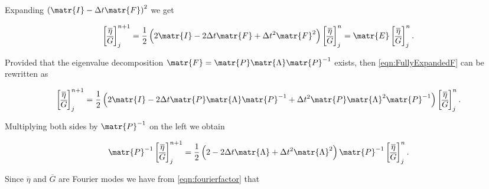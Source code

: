 Expanding $\left(\matr{I} - \Delta t\matr{F} \right)^2$ we get

\begin{equation}
\label{eqn:FullyExpandedF}
\begin{bmatrix}
\overline{\eta} \\ \overline{G}
\end{bmatrix}^{n+1}_j = \frac{1}{2} \left(2\matr{I}  -2\Delta t\matr{F} + \Delta t^2\matr{F}^2 \right) \begin{bmatrix}
\overline{\eta} \\ \overline{G}
\end{bmatrix}^{n}_j = \matr{E}\begin{bmatrix}
\overline{\eta} \\ \overline{G}
\end{bmatrix}^{n}_j.
\end{equation}

Provided that the eigenvalue decomposition $\matr{F} = \matr{P} \matr{\Lambda} \matr{P}^{-1} $ exists, then \eqref{eqn:FullyExpandedF} can be rewritten as 

\begin{equation*}
\begin{bmatrix}
\overline{\eta} \\ \overline{G}
\end{bmatrix}^{n+1}_j = \frac{1}{2} \left(2\matr{I}  -2\Delta t\matr{P} \matr{\Lambda} \matr{P}^{-1}  + \Delta t^2\matr{P} \matr{\Lambda}^2 \matr{P}^{-1} \right) \begin{bmatrix}
\overline{\eta} \\ \overline{G}
\end{bmatrix}^{n}_j.
\end{equation*}

Multiplying both sides by $\matr{P}^{-1}$ on the left we obtain

\begin{equation*}
\matr{P}^{-1} \begin{bmatrix}
\overline{\eta} \\ \overline{G}
\end{bmatrix}^{n+1}_j = \frac{1}{2} \left(2 -2\Delta t \matr{\Lambda}  + \Delta t^2 \matr{\Lambda}^2  \right)  \matr{P}^{-1} \begin{bmatrix}
\overline{\eta} \\ \overline{G}
\end{bmatrix}^{n}_j.
\end{equation*}

Since $\overline{\eta} $ and $\overline{G}$ are Fourier modes we have from \eqref{eqn:fourierfactor} that


